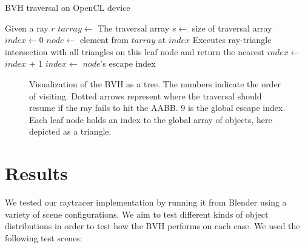 \documentclass{vgtc}
\begin{document}
\begin{algorithm}
\caption{BVH traversal on OpenCL device}
\label{alg:bvh-traversal}
\begin{algorithmic}[1]
\State Given a ray $r$
\State $tarray\gets$ The traversal array
\State $s\gets$ size of traversal array
\State $index\gets 0$
\State $node\gets$ element from $tarray$ at $index$
\State Executes ray-triangle intersection with all triangles on this leaf node and return the nearest
\Else
\State $index\gets$ $index$ + 1
\EndIf
\Else
\State $index\gets$ $node$'s escape index
\EndIf
\EndWhile
\end{algorithmic}
\end{algorithm}

\begin{figure}
\centering


\caption{Visualization of the BVH as a tree. The numbers indicate the
  order of visiting. Dotted arrows represent where the traversal
  should resume if the ray fails to hit the AABB. 9 is the global
  escape index. Each leaf node holds an index to the global array of
  objects, here depicted as a triangle.}
\label{fig:bvh}
\end{figure}

\section{Results}
\label{sec:results}

We tested our raytracer implementation by running it from Blender using
a variety of scene configurations. We aim to test different kinds of
object distributions in order to test how the BVH performs on each
case. We used the following test scenes:
\end{document}
